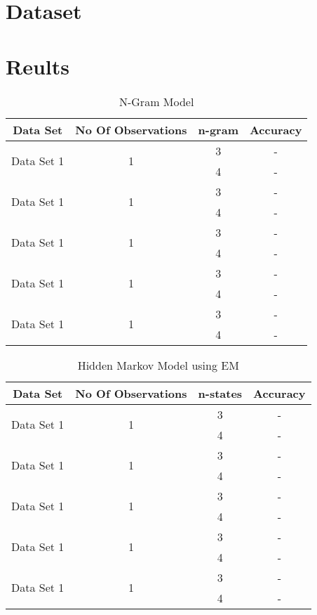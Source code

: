\documentclass{article} %
\begin{document}
\section{Dataset}

\section{Reults}

\begin{table}[t]
\caption{N-Gram Model}
\label{N-Gram_model}
\begin{center}
\begin{tabular}{ |c|c|c|c| }
\hline
\multicolumn{1}{|c|}{\bf Data Set} &\multicolumn{1}{|c|}{\bf No Of Observations} &\multicolumn{1}{|c|}{\bf n-gram} &\multicolumn{1}{|c|}{\bf Accuracy}\\
\hline
\multirow{2}{*}{Data Set 1}& \multirow{2}{*}{1} & 3 & - \\
& & 4 & - \\
\hline
\multirow{2}{*}{Data Set 1}& \multirow{2}{*}{1} & 3 & - \\
& & 4 & - \\
\hline
\multirow{2}{*}{Data Set 1}& \multirow{2}{*}{1} & 3 & - \\
& & 4 & - \\
\hline
\multirow{2}{*}{Data Set 1}& \multirow{2}{*}{1} & 3 & - \\
& & 4 & - \\
\hline
\multirow{2}{*}{Data Set 1}& \multirow{2}{*}{1} & 3 & - \\
& & 4 & - \\
\hline
\end{tabular}
\end{center}
\end{table}


\begin{table}[t]
\caption{Hidden Markov Model using EM}
\label{HMM_EM}
\begin{center}
\begin{tabular}{ |c|c|c|c| }
\hline
\multicolumn{1}{|c|}{\bf Data Set} &\multicolumn{1}{|c|}{\bf No Of Observations} &\multicolumn{1}{|c|}{\bf n-states} &\multicolumn{1}{|c|}{\bf Accuracy}\\
\hline
\multirow{2}{*}{Data Set 1}& \multirow{2}{*}{1} & 3 & - \\
& & 4 & - \\
\hline
\multirow{2}{*}{Data Set 1}& \multirow{2}{*}{1} & 3 & - \\
& & 4 & - \\
\hline
\multirow{2}{*}{Data Set 1}& \multirow{2}{*}{1} & 3 & - \\
& & 4 & - \\
\hline
\multirow{2}{*}{Data Set 1}& \multirow{2}{*}{1} & 3 & - \\
& & 4 & - \\
\hline
\multirow{2}{*}{Data Set 1}& \multirow{2}{*}{1} & 3 & - \\
& & 4 & - \\
\hline
\end{tabular}
\end{center}
\end{table}
\end{document}
